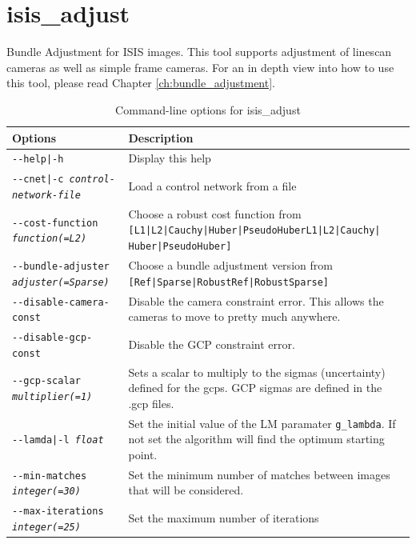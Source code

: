 
\section{isis\_adjust}

Bundle Adjustment for \ac{ISIS} images. This tool supports adjustment of
linescan cameras as well as simple frame cameras. For an in depth view
into how to use this tool, please read Chapter
\ref{ch:bundle_adjustment}.

\begin{longtable}{|l|p{10cm}|}
\caption{Command-line options for isis\_adjust}
\label{tbl:isise_adjust}
\endfirsthead
\endhead
\endfoot
\endlastfoot
\hline
Options & Description \\ \hline \hline
\texttt{-\/-help|-h} & Display this help \\ \hline
\texttt{-\/-cnet|-c \textit{control-network-file}} & Load a control network from a file \\ \hline
\texttt{-\/-cost-function \textit{function(=L2)}} & Choose a robust cost function from \texttt{[L1|L2|Cauchy|Huber|PseudoHuberL1|L2|Cauchy|} \texttt{Huber|PseudoHuber]} \\ \hline
\texttt{-\/-bundle-adjuster \textit{adjuster(=Sparse)}} & Choose a bundle adjustment version from \texttt{[Ref|Sparse|RobustRef|RobustSparse]} \\ \hline
\texttt{-\/-disable-camera-const} & Disable the camera constraint error. This allows the cameras to move to pretty much anywhere. \\ \hline
\texttt{-\/-disable-gcp-const} & Disable the GCP constraint error. \\ \hline
\texttt{-\/-gcp-scalar \textit{multiplier(=1)}} & Sets a scalar to multiply to the sigmas (uncertainty) defined for the gcps. GCP sigmas are defined in the .gcp files. \\ \hline
\texttt{-\/-lamda|-l \textit{float}} & Set the initial value of the LM paramater \texttt{g\_lambda}. If not set the algorithm will find the optimum starting point. \\ \hline
\texttt{-\/-min-matches \textit{integer(=30)}} & Set the minimum number of matches between images that will be considered. \\ \hline
\texttt{-\/-max-iterations \textit{integer(=25)}} & Set the maximum number of iterations \\ \hline

\end{longtable}
